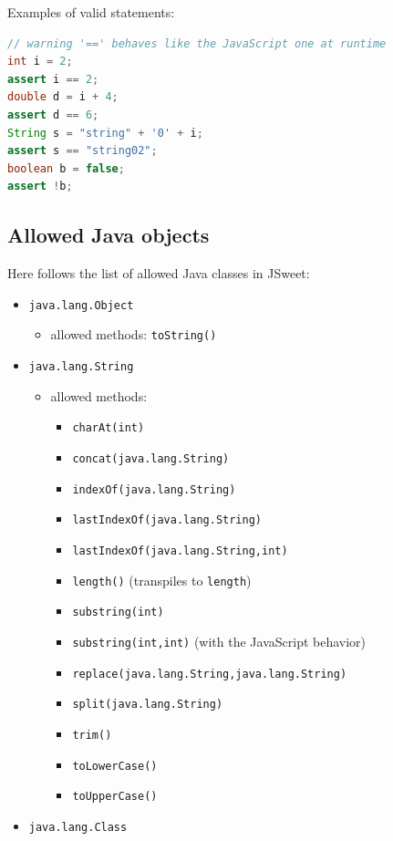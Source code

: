 \documentclass[a4paper]{report}
\begin{document}
\noindent
Examples of valid statements:

\begin{lstlisting}[language=Java]
// warning '==' behaves like the JavaScript one at runtime
int i = 2;
assert i == 2;
double d = i + 4;
assert d == 6;
String s = "string" + '0' + i;
assert s == "string02";
boolean b = false;
assert !b;
\end{lstlisting}

\subsection{Allowed Java objects}

Here follows the list of allowed Java classes in JSweet:

\begin{itemize}
\item \texttt{java.lang.Object}
	\begin{itemize}
	\item allowed methods: \texttt{toString()}
	\end{itemize}
\item \texttt{java.lang.String}
	\begin{itemize}
	\item allowed methods: 
			\begin{itemize}
				\item \texttt{charAt(int)}
				\item \texttt{concat(java.lang.String)} 
				\item \texttt{indexOf(java.lang.String)}
				\item \texttt{lastIndexOf(java.lang.String)}
				\item \texttt{lastIndexOf(java.lang.String,int)}
				\item \texttt{length()} (transpiles to \texttt{length})
				\item \texttt{substring(int)}
				\item \texttt{substring(int,int)} (with the JavaScript behavior)
				\item \texttt{replace(java.lang.String,java.lang.String)}
				\item \texttt{split(java.lang.String)}
				\item \texttt{trim()}
				\item \texttt{toLowerCase()}
				\item \texttt{toUpperCase()}
			\end{itemize}
	\end{itemize}
\item \texttt{java.lang.Class}

\end{itemize}
\end{document}
